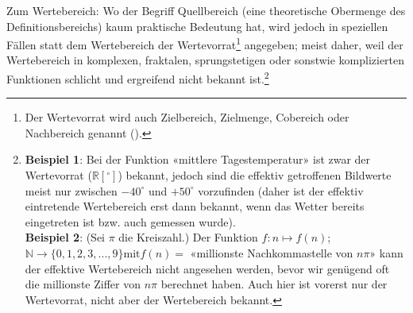 

\begin{bemerkung}{}{}
  Zum Wertebereich: Wo der Begriff Quellbereich (eine theoretische Obermenge
  des Definitionsbereichs) kaum praktische Bedeutung hat,
  wird jedoch in speziellen Fällen statt dem Wertebereich der
  Wertevorrat\footnote{Der Wertevorrat
    wird auch Zielbereich, Zielmenge,
    Cobereich oder Nachbereich
    genannt (\cite{FormelnUndTafeln19}).}
  angegeben; meist daher, weil der
  Wertebereich in komplexen, fraktalen, sprungstetigen oder sonstwie komplizierten Funktionen schlicht
  und ergreifend nicht bekannt ist.\footnote{\textbf{Beispiel 1}: Bei der Funktion
    «mittlere Tagestemperatur» ist zwar der Wertevorrat ($\mathbb{R}[{}^\circ]$)
    bekannt, jedoch sind die effektiv getroffenen Bildwerte meist nur
    zwischen $-40^\circ$ und $+50^\circ$ vorzufinden (daher ist der
    effektiv eintretende Wertebereich erst dann bekannt, wenn das Wetter
    bereits eingetreten ist bzw. auch gemessen wurde). \\
    \textbf{Beispiel 2}: (Sei $\pi$ die Kreiszahl.) Der Funktion $f: n\mapsto f(n)$; $\mathbb{N} \rightarrow \{0, 1, 2, 3, ..., 9\} \text{mit} f(n) = $
    «millionste Nachkommastelle von $n\pi$»
    kann der effektive Wertebereich nicht
  angesehen werden, bevor wir genügend oft die millionste Ziffer von
  $n\pi$ berechnet haben. Auch hier ist vorerst nur der Wertevorrat, nicht
  aber der Wertebereich bekannt.}
\end{bemerkung}


